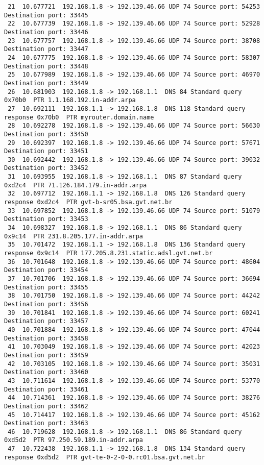 \documentclass[a4paper]{report} %
\begin{document}
\begin{lstlisting}
 21  10.677721  192.168.1.8 -> 192.139.46.66 UDP 74 Source port: 54253  Destination port: 33445
 22  10.677739  192.168.1.8 -> 192.139.46.66 UDP 74 Source port: 52928  Destination port: 33446
 23  10.677757  192.168.1.8 -> 192.139.46.66 UDP 74 Source port: 38708  Destination port: 33447
 24  10.677775  192.168.1.8 -> 192.139.46.66 UDP 74 Source port: 58307  Destination port: 33448
 25  10.677989  192.168.1.8 -> 192.139.46.66 UDP 74 Source port: 46970  Destination port: 33449
 26  10.681903  192.168.1.8 -> 192.168.1.1  DNS 84 Standard query 0x70b0  PTR 1.1.168.192.in-addr.arpa
 27  10.692111  192.168.1.1 -> 192.168.1.8  DNS 118 Standard query response 0x70b0  PTR myrouter.domain.name
 28  10.692278  192.168.1.8 -> 192.139.46.66 UDP 74 Source port: 56630  Destination port: 33450
 29  10.692397  192.168.1.8 -> 192.139.46.66 UDP 74 Source port: 57671  Destination port: 33451
 30  10.692442  192.168.1.8 -> 192.139.46.66 UDP 74 Source port: 39032  Destination port: 33452
 31  10.693955  192.168.1.8 -> 192.168.1.1  DNS 87 Standard query 0xd2c4  PTR 71.126.184.179.in-addr.arpa
 32  10.697712  192.168.1.1 -> 192.168.1.8  DNS 126 Standard query response 0xd2c4  PTR gvt-b-sr05.bsa.gvt.net.br
 33  10.697852  192.168.1.8 -> 192.139.46.66 UDP 74 Source port: 51079  Destination port: 33453
 34  10.698327  192.168.1.8 -> 192.168.1.1  DNS 86 Standard query 0x9c14  PTR 231.8.205.177.in-addr.arpa
 35  10.701472  192.168.1.1 -> 192.168.1.8  DNS 136 Standard query response 0x9c14  PTR 177.205.8.231.static.adsl.gvt.net.br
 36  10.701648  192.168.1.8 -> 192.139.46.66 UDP 74 Source port: 48604  Destination port: 33454
 37  10.701706  192.168.1.8 -> 192.139.46.66 UDP 74 Source port: 36694  Destination port: 33455
 38  10.701750  192.168.1.8 -> 192.139.46.66 UDP 74 Source port: 44242  Destination port: 33456
 39  10.701841  192.168.1.8 -> 192.139.46.66 UDP 74 Source port: 60241  Destination port: 33457
 40  10.701884  192.168.1.8 -> 192.139.46.66 UDP 74 Source port: 47044  Destination port: 33458
 41  10.703049  192.168.1.8 -> 192.139.46.66 UDP 74 Source port: 42023  Destination port: 33459
 42  10.703105  192.168.1.8 -> 192.139.46.66 UDP 74 Source port: 35031  Destination port: 33460
 43  10.711614  192.168.1.8 -> 192.139.46.66 UDP 74 Source port: 53770  Destination port: 33461
 44  10.714361  192.168.1.8 -> 192.139.46.66 UDP 74 Source port: 38276  Destination port: 33462
 45  10.714417  192.168.1.8 -> 192.139.46.66 UDP 74 Source port: 45162  Destination port: 33463
 46  10.719628  192.168.1.8 -> 192.168.1.1  DNS 86 Standard query 0xd5d2  PTR 97.250.59.189.in-addr.arpa
 47  10.722438  192.168.1.1 -> 192.168.1.8  DNS 134 Standard query response 0xd5d2  PTR gvt-te-0-2-0-0.rc01.bsa.gvt.net.br

\end{lstlisting}
\end{document}
